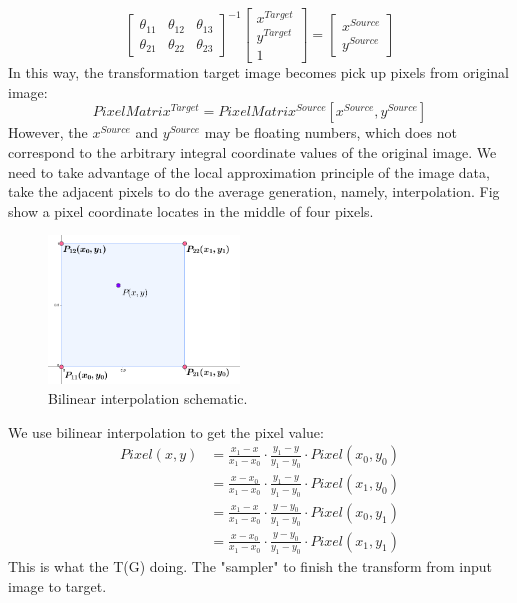\documentclass{IEEE_lsens}
\begin{document}
\begin{equation}
    \left [ \begin{array}{ccc}
             \theta_{11} & \theta_{12} & \theta_{13} \\
             \theta_{21} & \theta_{22} & \theta_{23}
           \end{array}
    \right ]^{-1}
    \left [ \begin{array}{c}
              x^{Target} \\
              y^{Target} \\
              1
            \end{array}
    \right ]
    =
    \left [ \begin{array}{c}
              x^{Source} \\
              y^{Source}
            \end{array}
    \right ]
\end{equation}
In this way, the transformation target image becomes pick up pixels from original image:
\begin{equation}
    PixelMatrix^{Target} = PixelMatrix^{Source}[x^{Source},y^{Source}]
\end{equation}
However, the $x^{Source}$ and $y^{Source}$ may be floating numbers, which does not correspond to the arbitrary integral coordinate values of the original image. We need to take advantage of the local approximation principle of the image data, take the adjacent pixels to do the average generation, namely, interpolation. Fig show a pixel coordinate locates in the middle of four pixels. 
\begin{figure}[!t]
\centering
  \includegraphics[width=2.0in]{interpolation}
  \caption{Bilinear interpolation schematic.}
  \label{bilinearInterpolation}
\end{figure}
We use bilinear interpolation to get the pixel value:
\begin{align}
  Pixel(x,y)
   &= \frac{x_1 - x}{x_1 - x_0} \cdot {\frac{y_1 - y}{y_1 - y_0}} \cdot {Pixel(x_0, y_0)} \nonumber \\
   &= \frac{x - x_0}{x_1 - x_0} \cdot {\frac{y_1 - y}{y_1 - y_0}} \cdot {Pixel(x_1, y_0)} \nonumber \\
   &= \frac{x_1 - x}{x_1 - x_0} \cdot {\frac{y - y_0}{y_1 - y_0}} \cdot {Pixel(x_0, y_1)} \nonumber \\
   &= \frac{x - x_0}{x_1 - x_0} \cdot {\frac{y - y_0}{y_1 - y_0}} \cdot {Pixel(x_1, y_1)}
\end{align}
This is what the T(G) doing. The "sampler" to finish the transform from input image to target. 
\end{document}
